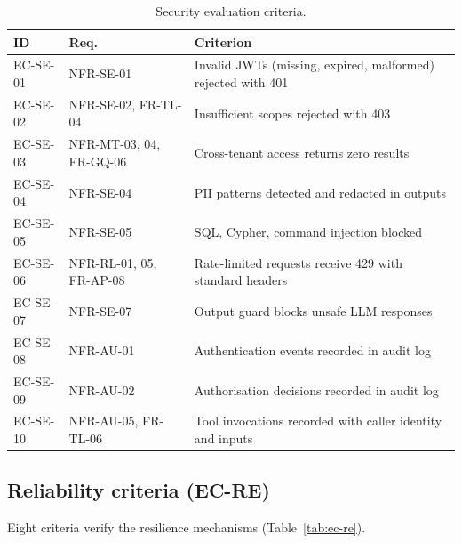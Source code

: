 \documentclass[a4paper,noexaminfo]{sapthesis}
\begin{document}
\begin{table}[ht]
\centering
\caption{Security evaluation criteria.}
\label{tab:ec-se}
\small
\begin{tabularx}{\textwidth}{@{}l l X@{}}
    \hline
    \textbf{ID} & \textbf{Req.} & \textbf{Criterion} \\
    \hline
    EC-SE-01 & NFR-SE-01 & Invalid JWTs (missing, expired, malformed)
        rejected with 401 \\
    EC-SE-02 & NFR-SE-02, FR-TL-04 & Insufficient scopes rejected
        with 403 \\
    EC-SE-03 & NFR-MT-03, 04, FR-GQ-06 & Cross-tenant access returns
        zero results \\
    EC-SE-04 & NFR-SE-04 & PII patterns detected and redacted in
        outputs \\
    EC-SE-05 & NFR-SE-05 & SQL, Cypher, command injection blocked \\
    EC-SE-06 & NFR-RL-01, 05, FR-AP-08 & Rate-limited requests receive
        429 with standard headers \\
    EC-SE-07 & NFR-SE-07 & Output guard blocks unsafe LLM
        responses \\
    EC-SE-08 & NFR-AU-01 & Authentication events recorded in audit
        log \\
    EC-SE-09 & NFR-AU-02 & Authorisation decisions recorded in audit
        log \\
    EC-SE-10 & NFR-AU-05, FR-TL-06 & Tool invocations recorded with
        caller identity and inputs \\
    \hline
\end{tabularx}
\end{table}

\subsection{Reliability criteria (EC-RE)}

Eight criteria verify the resilience mechanisms
(Table~\ref{tab:ec-re}).
\end{document}
